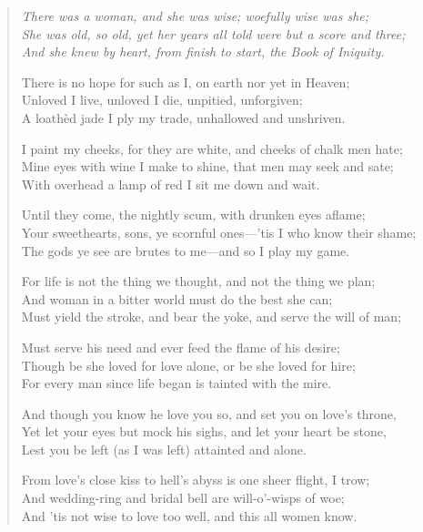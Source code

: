 

\begin{verse}
\textit{
There was a woman, and she was wise; woefully wise was she;\\
She was old, so old, yet her years all told were but a score and three;\\
And she knew by heart, from finish to start, the Book of Iniquity.
}

There is no hope for such as I, on earth nor yet in Heaven;\\
Unloved I live, unloved I die, unpitied, unforgiven;\\
A loathèd jade I ply my trade, unhallowed and unshriven.

I paint my cheeks, for they are white, and cheeks of chalk men hate;\\
Mine eyes with wine I make to shine, that men may seek and sate;\\
With overhead a lamp of red I sit me down and wait.

Until they come, the nightly scum, with drunken eyes aflame;\\
Your sweethearts, sons, ye scornful ones—'tis I who know their shame;\\
The gods ye see are brutes to me—and so I play my game.

For life is not the thing we thought, and not the thing we plan;\\
And woman in a bitter world must do the best she can;\\
Must yield the stroke, and bear the yoke, and serve the will of man;

Must serve his need and ever feed the flame of his desire;\\
Though be she loved for love alone, or be she loved for hire;\\
For every man since life began is tainted with the mire.

And though you know he love you so, and set you on love's throne,\\
Yet let your eyes but mock his sighs, and let your heart be stone,\\
Lest you be left (as I was left) attainted and alone.

From love's close kiss to hell's abyss is one sheer flight, I trow;\\
And wedding-ring and bridal bell are will-o'-wisps of woe;\\
And 'tis not wise to love too well, and this all women know.


\end{verse}
